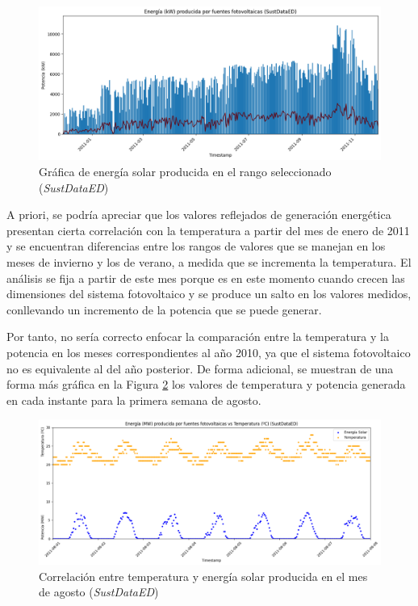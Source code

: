 \begin{figure}[H]
  \centering
  \includegraphics[width=1\textwidth]{img/diseno/matplotsolaryear.png}
  \caption{Gráfica de energía solar producida en el rango seleccionado (\textit{SustDataED})}
  \label{fig:solaryear}
\end{figure}

\vspace{3mm}

\pagebreak

A priori, se podría apreciar que los valores reflejados de generación energética presentan cierta correlación con la temperatura a partir del mes de enero de 2011 y se encuentran diferencias entre los rangos de valores que se manejan en los meses de invierno y los de verano, a medida que se incrementa la temperatura. El análisis se fija a partir de este mes porque es en este momento cuando crecen las dimensiones del sistema fotovoltaico y se produce un salto en los valores medidos, conllevando un incremento de la potencia que se puede generar. 

\vspace{3mm}

Por tanto, no sería correcto enfocar la comparación entre la temperatura y la potencia en los meses correspondientes al año 2010, ya que el sistema fotovoltaico no es equivalente al del año posterior. De forma adicional, se muestran de una forma más gráfica en la Figura \ref{fig:energiavstemp} los valores de temperatura y potencia generada en cada instante para la primera semana de agosto. 

\vspace{3mm}

\begin{figure}[h!]
  \centering
  \includegraphics[width=1\textwidth]{img/diseno/energiavstemp.png}
  \caption{Correlación entre temperatura y energía solar producida en el mes de agosto (\textit{SustDataED})}
  \label{fig:energiavstemp}
\end{figure}


